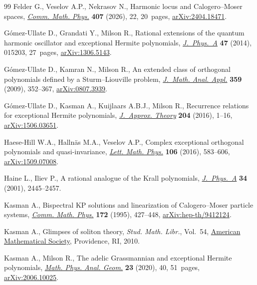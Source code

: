 \documentclass[pdftex]{sigma}
\numberwithin{equation}{section}
\theoremstyle{definition}
\begin{document}
\begin{thebibliography}{99}
Felder G., Veselov A.P., Nekrasov N., Harmonic locus and {C}alogero--{M}oser
 spaces, \href{https://doi.org/10.1007/s00220-025-05522-z}{\textit{Comm. Math.
 Phys.}} \textbf{407} (2026), 22, 20~pages,
 \href{http://arxiv.org/abs/2404.18471}{arXiv:2404.18471}.

G\'omez-Ullate D., Grandati Y., Milson R., Rational extensions of the quantum
 harmonic oscillator and exceptional {H}ermite polynomials,
 \href{https://doi.org/10.1088/1751-8113/47/1/015203}{\textit{J.~Phys.~A}}
 \textbf{47} (2014), 015203, 27~pages,
 \href{http://arxiv.org/abs/1306.5143}{arXiv:1306.5143}.

G\'omez-Ullate D., Kamran N., Milson R., An extended class of orthogonal
 polynomials defined by a {S}turm--{L}iouville problem,
 \href{https://doi.org/10.1016/j.jmaa.2009.05.052}{\textit{J.~Math. Anal.
 Appl.}} \textbf{359} (2009), 352--367,
 \href{http://arxiv.org/abs/0807.3939}{arXiv:0807.3939}.

G\'omez-Ullate D., Kasman A., Kuijlaars A.B.J., Milson R., Recurrence relations
 for exceptional {H}ermite polynomials,
 \href{https://doi.org/10.1016/j.jat.2015.12.003}{\textit{J.~Approx. Theory}}
 \textbf{204} (2016), 1--16,
 \href{http://arxiv.org/abs/1506.03651}{arXiv:1506.03651}.

Haese-Hill W.A., Halln\"as M.A., Veselov A.P., Complex exceptional orthogonal
 polynomials and quasi-invariance,
 \href{https://doi.org/10.1007/s11005-016-0828-8}{\textit{Lett. Math. Phys.}}
 \textbf{106} (2016), 583--606,
 \href{http://arxiv.org/abs/1509.07008}{arXiv:1509.07008}.

Haine L., Iliev P., A rational analogue of the {K}rall polynomials,
\href{https://doi.org/10.1088/0305-4470/34/11/333}{\textit{J.~Phys.~A}} \textbf{34} (2001), 2445--2457.

Kasman A., Bispectral {KP} solutions and linearization of {C}alogero--{M}oser
 particle systems, \href{https://doi.org/10.1007/BF02099435}{\textit{Comm.
 Math. Phys.}} \textbf{172} (1995), 427--448,
 \href{http://arxiv.org/abs/hep-th/9412124}{arXiv:hep-th/9412124}.

Kasman A., Glimpses of soliton theory, \textit{Stud. Math. Libr.}, Vol.~54,
 \href{https://doi.org/10.1090/stml/054}{American Mathematical Society},
 Providence, RI, 2010.

Kasman A., Milson R., The adelic {G}rassmannian and exceptional {H}ermite
 polynomials, \href{https://doi.org/10.1007/s11040-020-09365-z}{\textit{Math.
 Phys. Anal. Geom.}} \textbf{23} (2020), 40, 51~pages,
 \href{http://arxiv.org/abs/2006.10025}{arXiv:2006.10025}.


\end{thebibliography}
\end{document}
